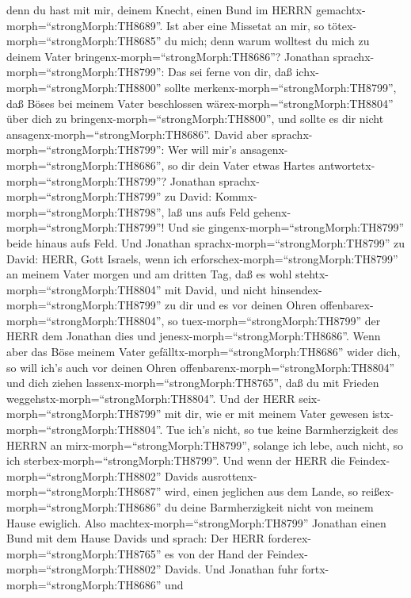 denn du hast mit mir, deinem Knecht, einen Bund im HERRN
gemachtx-morph=``strongMorph:TH8689''. Ist aber eine Missetat an mir, so
tötex-morph=``strongMorph:TH8685'' du mich; denn warum wolltest du mich
zu deinem Vater bringenx-morph=``strongMorph:TH8686''? 
Jonathan sprachx-morph=``strongMorph:TH8799'': Das sei ferne von dir,
daß ichx-morph=``strongMorph:TH8800'' sollte
merkenx-morph=``strongMorph:TH8799'', daß Böses bei meinem Vater
beschlossen wärex-morph=``strongMorph:TH8804'' über dich zu
bringenx-morph=``strongMorph:TH8800'', und sollte es dir nicht
ansagenx-morph=``strongMorph:TH8686''.  David aber
sprachx-morph=``strongMorph:TH8799'': Wer will mir's
ansagenx-morph=``strongMorph:TH8686'', so dir dein Vater etwas Hartes
antwortetx-morph=``strongMorph:TH8799''?  Jonathan
sprachx-morph=``strongMorph:TH8799'' zu David:
Kommx-morph=``strongMorph:TH8798'', laß uns aufs Feld
gehenx-morph=``strongMorph:TH8799''! Und sie
gingenx-morph=``strongMorph:TH8799'' beide hinaus aufs Feld.
 Und Jonathan sprachx-morph=``strongMorph:TH8799'' zu
David: HERR, Gott Israels, wenn ich
erforschex-morph=``strongMorph:TH8799'' an meinem Vater morgen und am
dritten Tag, daß es wohl stehtx-morph=``strongMorph:TH8804'' mit David,
und nicht hinsendex-morph=``strongMorph:TH8799'' zu dir und es vor
deinen Ohren offenbarex-morph=``strongMorph:TH8804'',  so
tuex-morph=``strongMorph:TH8799'' der HERR dem Jonathan dies und
jenesx-morph=``strongMorph:TH8686''. Wenn aber das Böse meinem Vater
gefälltx-morph=``strongMorph:TH8686'' wider dich, so will ich's auch vor
deinen Ohren offenbarenx-morph=``strongMorph:TH8804'' und dich ziehen
lassenx-morph=``strongMorph:TH8765'', daß du mit Frieden
weggehstx-morph=``strongMorph:TH8804''. Und der HERR
seix-morph=``strongMorph:TH8799'' mit dir, wie er mit meinem Vater
gewesen istx-morph=``strongMorph:TH8804''.  Tue ich's
nicht, so tue keine Barmherzigkeit des HERRN an
mirx-morph=``strongMorph:TH8799'', solange ich lebe, auch nicht, so ich
sterbex-morph=``strongMorph:TH8799''.  Und wenn der HERR
die Feindex-morph=``strongMorph:TH8802'' Davids
ausrottenx-morph=``strongMorph:TH8687'' wird, einen jeglichen aus dem
Lande, so reißex-morph=``strongMorph:TH8686'' du deine Barmherzigkeit
nicht von meinem Hause ewiglich.  Also
machtex-morph=``strongMorph:TH8799'' Jonathan einen Bund mit dem Hause
Davids und sprach: Der HERR forderex-morph=``strongMorph:TH8765'' es von
der Hand der Feindex-morph=``strongMorph:TH8802'' Davids. 
Und Jonathan fuhr fortx-morph=``strongMorph:TH8686'' und
